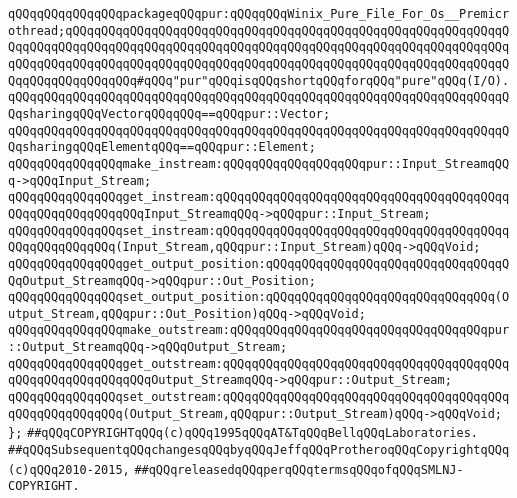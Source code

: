 \verb|qQQqqQQqqQQqqQQqpackageqQQqpur:qQQqqQQqWinix_Pure_File_For_Os__Premicrothread;qQQqqQQqqQQqqQQqqQQqqQQqqQQqqQQqqQQqqQQqqQQqqQQqqQQqqQQqqQQqqQQqqQQqqQQqqQQqqQQqqQQqqQQqqQQqqQQqqQQqqQQqqQQqqQQqqQQqqQQqqQQqqQQqqQQqqQQqqQQqqQQqqQQqqQQqqQQqqQQqqQQqqQQqqQQqqQQqqQQqqQQqqQQqqQQqqQQqqQQqqQQqqQQqqQQqqQQqqQQq#qQQq"pur"qQQqisqQQqshortqQQqforqQQq"pure"qQQq(I/O).|\newline
\verb|qQQqqQQqqQQqqQQqqQQqqQQqqQQqqQQqqQQqqQQqqQQqqQQqqQQqqQQqqQQqqQQqqQQqqQQqsharingqQQqVectorqQQqqQQq==qQQqpur::Vector;|\newline
\verb|qQQqqQQqqQQqqQQqqQQqqQQqqQQqqQQqqQQqqQQqqQQqqQQqqQQqqQQqqQQqqQQqqQQqqQQqsharingqQQqElementqQQq==qQQqpur::Element;|\newline
\newline
\verb|qQQqqQQqqQQqqQQqmake_instream:qQQqqQQqqQQqqQQqqQQqpur::Input_StreamqQQq->qQQqInput_Stream;|\newline
\newline
\verb|qQQqqQQqqQQqqQQqget_instream:qQQqqQQqqQQqqQQqqQQqqQQqqQQqqQQqqQQqqQQqqQQqqQQqqQQqqQQqqQQqInput_StreamqQQq->qQQqpur::Input_Stream;|\newline
\verb|qQQqqQQqqQQqqQQqset_instream:qQQqqQQqqQQqqQQqqQQqqQQqqQQqqQQqqQQqqQQqqQQqqQQqqQQqqQQq(Input_Stream,qQQqpur::Input_Stream)qQQq->qQQqVoid;|\newline
\newline
\verb|qQQqqQQqqQQqqQQqget_output_position:qQQqqQQqqQQqqQQqqQQqqQQqqQQqqQQqqQQqOutput_StreamqQQq->qQQqpur::Out_Position;|\newline
\verb|qQQqqQQqqQQqqQQqset_output_position:qQQqqQQqqQQqqQQqqQQqqQQqqQQqqQQq(Output_Stream,qQQqpur::Out_Position)qQQq->qQQqVoid;|\newline
\newline
\verb|qQQqqQQqqQQqqQQqmake_outstream:qQQqqQQqqQQqqQQqqQQqqQQqqQQqqQQqqQQqpur::Output_StreamqQQq->qQQqOutput_Stream;|\newline
\newline
\verb|qQQqqQQqqQQqqQQqget_outstream:qQQqqQQqqQQqqQQqqQQqqQQqqQQqqQQqqQQqqQQqqQQqqQQqqQQqqQQqqQQqOutput_StreamqQQq->qQQqpur::Output_Stream;|\newline
\verb|qQQqqQQqqQQqqQQqset_outstream:qQQqqQQqqQQqqQQqqQQqqQQqqQQqqQQqqQQqqQQqqQQqqQQqqQQqqQQq(Output_Stream,qQQqpur::Output_Stream)qQQq->qQQqVoid;|\newline
\verb|};|\newline
\newline
\newline
\newline
\verb|##qQQqCOPYRIGHTqQQq(c)qQQq1995qQQqAT&TqQQqBellqQQqLaboratories.|\newline
\verb|##qQQqSubsequentqQQqchangesqQQqbyqQQqJeffqQQqProtheroqQQqCopyrightqQQq(c)qQQq2010-2015,|\newline
\verb|##qQQqreleasedqQQqperqQQqtermsqQQqofqQQqSMLNJ-COPYRIGHT.|\newline

